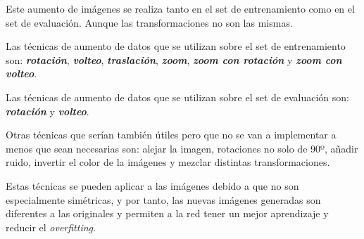 \documentclass{uc3mpracticas}
\begin{document}
  \vspace{2mm}

  Este aumento de imágenes se realiza tanto en el set de entrenamiento como en el set de evaluación. Aunque las transformaciones no son las mismas.

  \vspace{2mm}

  Las técnicas de aumento de datos que se utilizan sobre el set de entrenamiento son: \textit{\textbf{rotación}}, \textit{\textbf{volteo}}, \textit{\textbf{traslación}}, \textit{\textbf{zoom}}, \textit{\textbf{zoom con rotación}} y \textit{\textbf{zoom con volteo}}.

  \vspace{1mm}

  Las técnicas de aumento de datos que se utilizan sobre el set de evaluación son: \textit{\textbf{rotación}} y \textit{\textbf{volteo}}.

  \vspace{3mm}

  Otras técnicas que serían también útiles pero que no se van a implementar a menos que sean necesarias son: alejar la imagen, rotaciones no solo de 90º, añadir ruido, invertir el color de la imágenes y mezclar distintas transformaciones.

  \vspace{2mm}

  Estas técnicas se pueden aplicar a las imágenes debido a que no son especialmente simétricas, y por tanto, las nuevas imágenes generadas son diferentes a las originales y permiten a la red tener un mejor aprendizaje y reducir el \textit{overfitting}.
\end{document}
